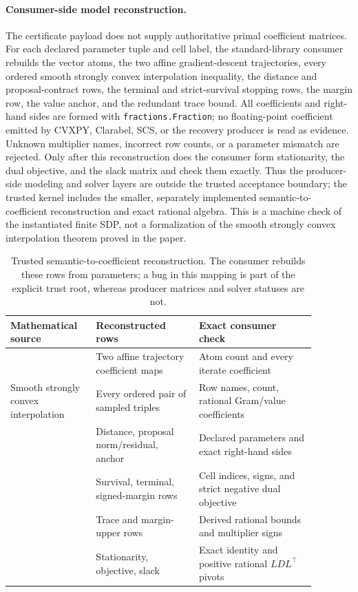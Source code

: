 \documentclass[smallextended]{svjour3}
\begin{document}
\paragraph{Consumer-side model reconstruction.}
The certificate payload does not supply authoritative primal coefficient matrices.
For each declared parameter tuple and cell label, the standard-library
consumer rebuilds the vector atoms, the two affine
gradient-descent trajectories, every ordered smooth strongly convex
interpolation inequality, the distance and proposal-contract rows, the
terminal and strict-survival stopping rows, the margin row, the value anchor,
and the redundant trace bound.  All coefficients and right-hand sides are
formed with \texttt{fractions.Fraction}; no floating-point coefficient emitted
by CVXPY, Clarabel, SCS, or the recovery producer is read as evidence.  Unknown
multiplier names, incorrect row counts, or a parameter mismatch are rejected.
Only after this reconstruction does the consumer form stationarity, the dual
objective, and the slack matrix and check them exactly.  Thus the
producer-side modeling and solver layers are outside the trusted acceptance
boundary; the trusted kernel includes the smaller, separately implemented
semantic-to-coefficient reconstruction and exact rational algebra.  This is a
machine check of the instantiated finite SDP, not a formalization of the
smooth strongly convex interpolation theorem proved in the paper.

\begin{table}[htbp]
\centering
\scriptsize
\caption{Trusted semantic-to-coefficient reconstruction.  The consumer
rebuilds these rows from parameters; a bug in this mapping is part of the
explicit trust root, whereas producer matrices and solver statuses are not.}
\label{tab:semantic-map}
\begin{tabular}{P{0.24\linewidth}P{0.30\linewidth}P{0.34\linewidth}}
\toprule
Mathematical source & Reconstructed rows & Exact consumer check\\
\midrule
{} & Two affine trajectory coefficient maps & Atom count and every
iterate coefficient\\
Smooth strongly convex interpolation & Every ordered pair of sampled triples
& Row names, count, rational Gram/value coefficients\\
 & Distance, proposal norm/residual, anchor &
Declared parameters and exact right-hand sides\\
 & Survival, terminal, signed-margin rows &
Cell indices, signs, and strict negative dual objective\\
 & Trace and margin-upper rows & Derived rational bounds
and multiplier signs\\
 & Stationarity, objective, slack & Exact identity and
positive rational $LDL^\top$ pivots\\
\bottomrule
\end{tabular}
\end{table}
\end{document}
